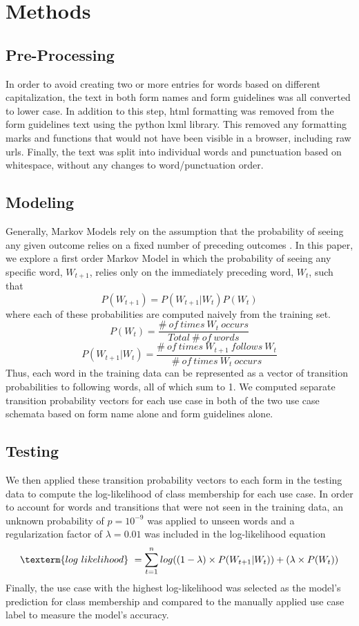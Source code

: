\documentclass{article}
\begin{document}
\section{Methods}
\subsection{Pre-Processing}
In order to avoid creating two or more entries for words based on different capitalization, the text in both form names and form guidelines was all converted to lower case. In addition to this step, html formatting was removed from the form guidelines text using the python lxml library. This removed any formatting marks and functions that would not have been visible in a browser, including raw urls. Finally, the text was split into individual words and punctuation based on whitespace, without any changes to word/punctuation order.

\subsection{Modeling}
Generally, Markov Models rely on the assumption that the probability of seeing any given outcome relies on a fixed number of preceding outcomes \cite{textMining}. In this paper, we explore a first order Markov Model in which the probability of seeing any specific word, $W_{t+1}$, relies only on the immediately preceding word, $W_{t}$, such that $$P(W_{t+1})=P(W_{t+1}|W_{t})P(W_{t})$$ where each of these probabilities are computed naively from the training set. $$P(W_{t})=\frac{\#\ of\ times\ W_{t}\ occurs}{Total\ \#\ of\ words}$$ $$P(W_{t+1}|W_{t}) = \frac{\# \ of\ times\ W_{t+1}\ follows\ W_{t}}{\# \ of\ times\ W_{t}\ occurs}$$ Thus, each word in the training data can be represented as a vector of transition probabilities to following words, all of which sum to 1. We computed separate transition probability vectors for each use case in both of the two use case schemata based on form name alone and form guidelines alone.

\subsection{Testing}
We then applied these transition probability vectors to each form in the testing data to compute the log-likelihood of class membership for each use case. In order to account for words and transitions that were not seen in the training data, an unknown probability of $p=10^{-9}$ was applied to unseen words and a regularization factor of $\lambda = 0.01$ was included in the log-likelihood equation $$\texterm{log\ likelihood}\ = \sum_{t=1}^{n} log((1-\lambda)\times P(W_{t+1}|W_{t}))+(\lambda \times P(W_{t}))$$ Finally, the use case with the highest log-likelihood was selected as the model's prediction for class membership and compared to the manually applied use case label to measure the model's accuracy.
\end{document}
